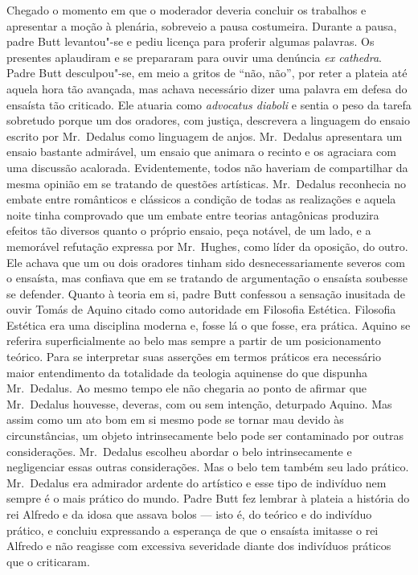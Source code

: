 Chegado o momento em que o moderador deveria concluir os trabalhos e apresentar
a moção à plenária, sobreveio a pausa costumeira.  Durante a pausa, padre Butt
levantou"-se e pediu licença para proferir algumas palavras.  Os presentes
aplaudiram e se prepararam para ouvir uma denúncia \textit{ex cathedra}.  Padre
Butt desculpou"-se, em meio a gritos de “não, não”, por reter a plateia até
aquela hora tão avançada, mas achava necessário dizer uma palavra em defesa do
ensaísta tão criticado.  Ele atuaria como \textit{advocatus diaboli} e sentia o
peso da tarefa sobretudo porque um dos oradores, com justiça, descrevera a
linguagem do ensaio escrito por Mr.~Dedalus como linguagem de anjos.  
Mr.~Dedalus apresentara um ensaio bastante admirável, um ensaio que animara o
recinto e os agraciara com uma discussão acalorada.  Evidentemente, todos não
haveriam de compartilhar da mesma opinião em se tratando de \label{questoes"-artisticas} questões
artísticas.  Mr.~Dedalus reconhecia no embate entre românticos e clássicos a
condição de todas as realizações e aquela noite tinha comprovado que um embate
entre teorias antagônicas produzira efeitos tão diversos quanto o próprio
ensaio, peça notável, de um lado, e a memorável refutação expressa por 
Mr.~Hughes, como líder da oposição, do outro.  Ele achava que um ou dois oradores
tinham sido desnecessariamente severos com o ensaísta, mas confiava que em se
tratando de argumentação o ensaísta soubesse se defender.  Quanto à teoria em
si, padre Butt confessou a sensação inusitada de ouvir Tomás de Aquino citado
como autoridade em Filosofia Estética.  Filosofia Estética era uma disciplina
moderna e, fosse lá o que fosse, era prática.  Aquino se referira
superficialmente ao belo mas sempre a partir de um posicionamento teórico.
Para se interpretar suas asserções em termos práticos era necessário maior
entendimento da totalidade da teologia aquinense do que dispunha Mr.~Dedalus.
Ao mesmo tempo ele não chegaria ao ponto de afirmar que Mr.~Dedalus houvesse,
deveras, com ou sem intenção, deturpado Aquino.  Mas assim como um ato bom em
si mesmo pode se tornar mau devido às circunstâncias, um objeto intrinsecamente
belo pode ser contaminado por outras considerações.  Mr.~Dedalus escolheu
abordar o belo intrinsecamente e negligenciar essas outras considerações.  Mas
o belo tem também seu lado prático.  Mr.~Dedalus era admirador ardente do
artístico e esse tipo de indivíduo nem sempre é o mais prático do mundo.  Padre
Butt fez lembrar à plateia a história do rei Alfredo e da idosa que assava
bolos --- isto é, do teórico e do indivíduo prático, e concluiu expressando a
esperança de que o ensaísta imitasse o rei Alfredo e não reagisse com excessiva
severidade diante dos indivíduos práticos que o criticaram.

